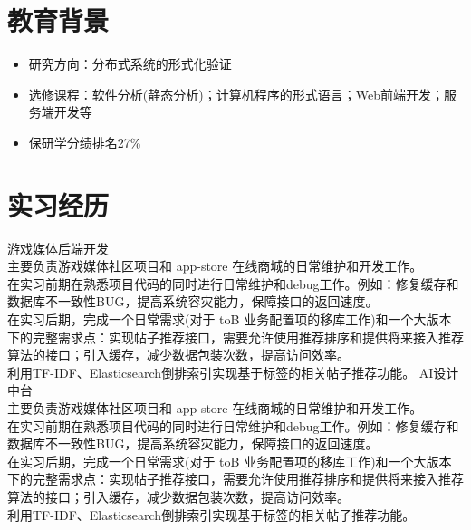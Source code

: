 \documentclass{resume}
\begin{document}

\sepspace
{}

\section{教育背景}
\begin{itemize}
    \item 研究方向：分布式系统的形式化验证
\end{itemize}
\begin{itemize}
    \item 选修课程：软件分析(静态分析)；计算机程序的形式语言；Web前端开发；服务端开发等
    \item 保研学分绩排名27\%
\end{itemize}
\sepspace

\section{实习经历}
\Content
{{游戏媒体后端开发}}
{
    {\\主要负责游戏媒体社区项目和 app-store 在线商城的日常维护和开发工作。}
    {\\在实习前期在熟悉项目代码的同时进行日常维护和debug工作。例如：修复缓存和数据库不一致性BUG，提高系统容灾能力，保障接口的返回速度。}
    {\\在实习后期，完成一个日常需求(对于 toB 业务配置项的移库工作)和一个大版本下的完整需求点：实现帖子推荐接口，需要允许使用推荐排序和提供将来接入推荐算法的接口；引入缓存，减少数据包装次数，提高访问效率。}
    {\\利用TF-IDF、Elasticsearch倒排索引实现基于标签的相关帖子推荐功能。}
}
\Content
{{AI设计中台}}
{
    {\\主要负责游戏媒体社区项目和 app-store 在线商城的日常维护和开发工作。}
    {\\在实习前期在熟悉项目代码的同时进行日常维护和debug工作。例如：修复缓存和数据库不一致性BUG，提高系统容灾能力，保障接口的返回速度。}
    {\\在实习后期，完成一个日常需求(对于 toB 业务配置项的移库工作)和一个大版本下的完整需求点：实现帖子推荐接口，需要允许使用推荐排序和提供将来接入推荐算法的接口；引入缓存，减少数据包装次数，提高访问效率。}
    {\\利用TF-IDF、Elasticsearch倒排索引实现基于标签的相关帖子推荐功能。}
}
\sepspace
\end{document}
